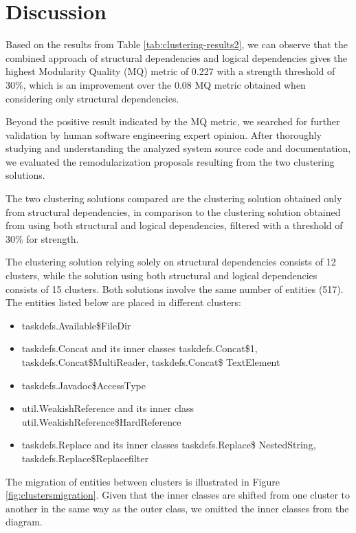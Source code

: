 \documentclass[conference]{IEEEtran}
\begin{document}
\section{Discussion}
\label{discussion}

Based on the results from Table \ref{tab:clustering-results2}, we can observe that the combined approach of structural dependencies and logical dependencies gives the highest Modularity Quality (MQ) metric of 0.227 with a strength threshold of 30\%, which is an improvement over the 0.08 MQ metric obtained when considering only structural dependencies.

Beyond the positive result indicated by the MQ metric, we searched for further validation by human software engineering expert opinion. After thoroughly studying and understanding the analyzed system source code and documentation, we evaluated the remodularization proposals resulting from the two clustering solutions.

The two clustering solutions compared are the clustering solution obtained only from structural dependencies, in comparison to the clustering solution obtained from using both structural and logical dependencies, filtered with a threshold of 30\% for strength.

The clustering solution relying solely on structural dependencies consists of 12 clusters, while the solution using both structural and logical dependencies consists of 15 clusters. Both solutions involve the same number of entities (517). The entities listed below are placed in different clusters:

\begin{itemize}
    \item taskdefs.Available\$FileDir
    \item taskdefs.Concat and its inner classes taskdefs.Concat\$1, taskdefs.Concat\$MultiReader, taskdefs.Concat\$ TextElement
    \item taskdefs.Javadoc\$AccessType
    \item util.WeakishReference and its inner class util.WeakishReference\$HardReference
    \item taskdefs.Replace and its inner classes taskdefs.Replace\$ NestedString, taskdefs.Replace\$Replacefilter
\end{itemize}

The migration of entities between clusters is illustrated in Figure \ref{fig:clustersmigration}. Given that the inner classes are shifted from one cluster to another in the same way as the outer class, we omitted the inner classes from the diagram.
\end{document}
